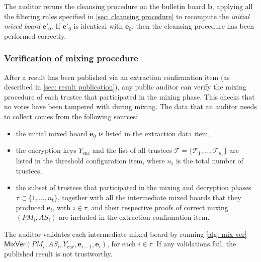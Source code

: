 The auditor reruns the cleansing procedure on the bulletin board $\boldsymbol{b}$, applying all the filtering rules specified in \cref{sec: cleansing procedure} to recompute the \textit{initial mixed board} $\boldsymbol{e'}_0$. If $\boldsymbol{e'}_0$ is identical with $\boldsymbol{e}_0$, then the cleansing procedure has been performed correctly.


\subsubsection{Verification of mixing procedure} \label{sec: verification of mixing procedure}
After a result has been published via an extraction confirmation item (as described in \cref{sec: result publication}), any public auditor can verify the mixing procedure of each trustee that participated in the mixing phase. This checks that no votes have been tampered with during mixing. The data that an auditor needs to collect comes from the following sources:
\begin{itemize}
    \item the initial mixed board $\boldsymbol{e}_0$ is listed in the extraction data item,
    \item the encryption keys $Y_\mathrm{enc}$ and the list of all trustees $\boldsymbol{\mathcal{T}} = \{ \mathcal{T}_1, ..., \mathcal{T}_{n_\mathrm{t}} \}$ are listed in the threshold configuration item, where $n_\mathrm{t}$ is the total number of trustees,
    \item the subset of trustees that participated in the mixing and decryption phases $\tau \subset \{ 1, ..., n_\mathrm{t} \}$, together with all the intermediate mixed boards that they produced $\boldsymbol{e}_i$, with $i \in \tau$, and their respective proofs of correct mixing $(PM_i, AS_i)$ are included in the extraction confirmation item.
\end{itemize}

The auditor validates each intermediate mixed board by running \cref{alg: mix ver} $\mathsf{MixVer} (PM_i, AS_i, Y_\mathrm{enc}, \boldsymbol{e}_{i-1}, \boldsymbol{e}_i)$, for each $i \in \tau$. If any validations fail, the published result is not trustworthy.


